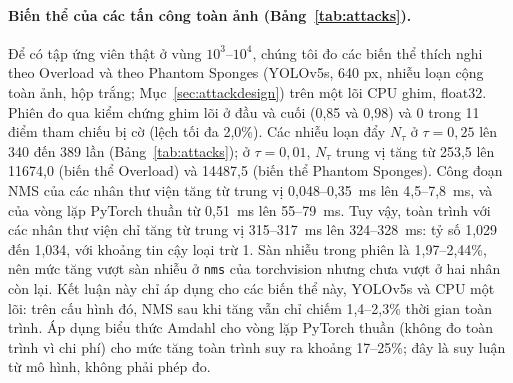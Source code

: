 \documentclass[a4paper,fleqn]{cas-dc}
\newcommand{\Ntau}{N_{\tau}}
\begin{document}
\paragraph{Biến thể của các tấn công toàn ảnh (Bảng~\ref{tab:attacks}).}
\label{sec:attacks}
Để có tập ứng viên thật ở vùng $10^3$--$10^4$, chúng tôi đo các biến thể thích nghi theo Overload và theo Phantom Sponges (YOLOv5s, 640 px, nhiễu loạn cộng toàn ảnh, hộp trắng; Mục~\ref{sec:attackdesign}) trên một lõi CPU ghim, float32. Phiên đo qua kiểm chứng ghim lõi ở đầu và cuối (0,85 và 0,98) và 0 trong 11 điểm tham chiếu bị cờ (lệch tối đa 2,0\%). Các nhiễu loạn đẩy $\Ntau$ ở $\tau=0{,}25$ lên 340 đến 389 lần (Bảng~\ref{tab:attacks}); ở $\tau=0{,}01$, $\Ntau$ trung vị tăng từ 253,5 lên 11674,0 (biến thể Overload) và 14487,5 (biến thể Phantom Sponges). Công đoạn NMS của các nhân thư viện tăng từ trung vị 0,048--0,35~ms lên 4,5--7,8~ms, và của vòng lặp PyTorch thuần từ 0,51~ms lên 55--79~ms. Tuy vậy, toàn trình với các nhân thư viện chỉ tăng từ trung vị 315--317~ms lên 324--328~ms: tỷ số 1,029 đến 1,034, với khoảng tin cậy loại trừ 1. Sàn nhiễu trong phiên là 1,97--2,44\%, nên mức tăng vượt sàn nhiễu ở \texttt{nms} của torchvision nhưng chưa vượt ở hai nhân còn lại. Kết luận này chỉ áp dụng cho các biến thể này, YOLOv5s và CPU một lõi: trên cấu hình đó, NMS sau khi tăng vẫn chỉ chiếm 1,4--2,3\% thời gian toàn trình. Áp dụng biểu thức Amdahl cho vòng lặp PyTorch thuần (không đo toàn trình vì chi phí) cho mức tăng toàn trình suy ra khoảng 17--25\%; đây là suy luận từ mô hình, không phải phép đo.
\end{document}
